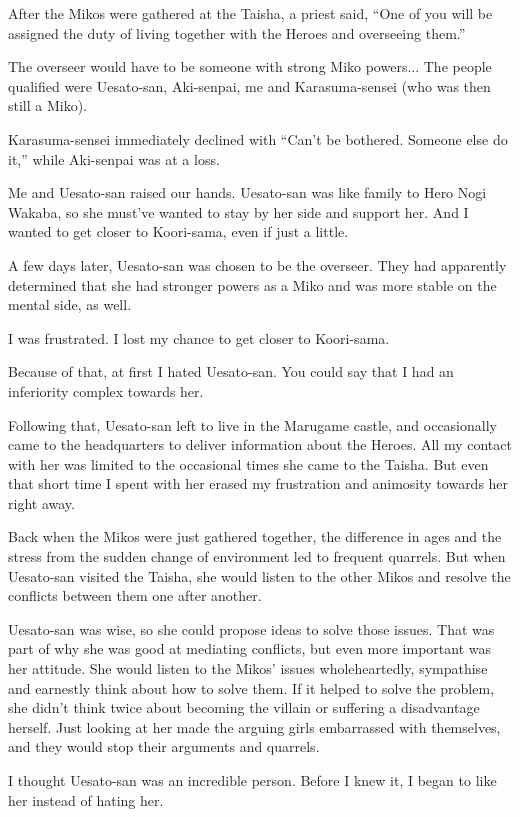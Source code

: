 After the Mikos were gathered at the Taisha, a priest said, ``One of you will be assigned the duty of living together with the Heroes and overseeing them.''

The overseer would have to be someone with strong Miko powers... The people qualified were Uesato-san, Aki-senpai, me and Karasuma-sensei (who was then still a Miko).

Karasuma-sensei immediately declined with ``Can't be bothered. Someone else do it,'' while Aki-senpai was at a loss.

Me and Uesato-san raised our hands. Uesato-san was like family to Hero Nogi Wakaba, so she must've wanted to stay by her side and support her. And I wanted to get closer to Koori-sama, even if just a little.

A few days later, Uesato-san was chosen to be the overseer. They had apparently determined that she had stronger powers as a Miko and was more stable on the mental side, as well.

I was frustrated. I lost my chance to get closer to Koori-sama.

Because of that, at first I hated Uesato-san. You could say that I had an inferiority complex towards her.

Following that, Uesato-san left to live in the Marugame castle, and occasionally came to the headquarters to deliver information about the Heroes. All my contact with her was limited to the occasional times she came to the Taisha. But even that short time I spent with her erased my frustration and animosity towards her right away.

Back when the Mikos were just gathered together, the difference in ages and the stress from the sudden change of environment led to frequent quarrels. But when Uesato-san visited the Taisha, she would listen to the other Mikos and resolve the conflicts between them one after another.

Uesato-san was wise, so she could propose ideas to solve those issues. That was part of why she was good at mediating conflicts, but even more important was her attitude. She would listen to the Mikos' issues wholeheartedly, sympathise and earnestly think about how to solve them. If it helped to solve the problem, she didn't think twice about becoming the villain or suffering a disadvantage herself. Just looking at her made the arguing girls embarrassed with themselves, and they would stop their arguments and quarrels.

I thought Uesato-san was an incredible person. Before I knew it, I began to like her instead of hating her.

